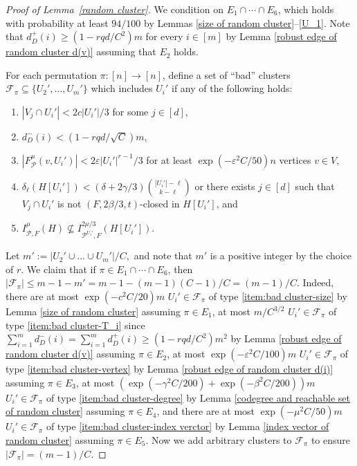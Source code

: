 \documentclass[11pt, letterpaper]{amsart}
\theoremstyle{plain}
\numberwithin{equation}{section}
\theoremstyle{definition}
\renewcommand{\vec}[1]{{\mathbf #1}}
\begin{document}
 
\begin{proof}[Proof of Lemma~\ref{random cluster}]
We condition on $E_1\cap \cdots\cap E_6$, which holds with probability at least $94/100$ by Lemmas \ref{size of random cluster}--\ref{U_1}. Note that $d_D^+(i)\ge(1-rqd/C^2)m $ for every $i\in [m]$ by Lemma \ref{robust edge of random cluster d(v)} assuming that \(E_2\) holds.

        For each permutation $\pi:[n]\rightarrow [n]$, define a set of ``bad'' clusters $\mathcal{F}_{\pi}\subseteq\{U_2',\dots,U_m'\}$ which includes $U_i'$ if any of the following holds:


        \begin{enumerate}[label=(A\arabic*)]
            \item $|V_j\cap U_i'|<2c|U_i'|/3$ for some $j\in [d]$, \label{item:bad cluster-size}
            \item $d_D^-(i)<(1-rqd/\sqrt{C})m$,\label{item:bad cluster-T_i}
            \item $|F^{\mu}_{\mathcal{P}}(v,U_i')|$$< 2\varepsilon{|U_i'|}^{r-1}/3$ for at least $\exp{\left(-\varepsilon^2 C/50\right)}n$ vertices $v\in V$,\label{item:bad cluster-vertex}
            \item $\delta_{\ell}(H[U_i'])<(\delta+2\gamma/3)\binom{|U_i'|-\ell}{k-\ell}$ or there exists $j\in[d]$ such that $V_j\cap U_i'$ is not $(F,2\beta/3,t)$-closed in $H[U_i']$, and \label{item:bad cluster-degree}
            \item 
            \(I_{\mathcal{P},F}^{\mu}(H)\nsubseteq I_{ \mathcal{P}^{U_i'},F}^{2\mu/3}(H[U_i'])\).\label{item:bad cluster-index verctor}
        \end{enumerate}
        Let $m':=|U_2'\cup\dots\cup U_m'|/C,$ and note that $m'$ is a positive integer by the choice of $r$. We claim that if $\pi \in E_1\cap \cdots\cap E_6$, then $|\mathcal{F}_{\pi}|\le m-1-m'=m-1-(m-1)(C-1)/C=(m-1)/C$. Indeed, 
        there are at most $\exp{(-c^2C/20)}m$ $U_i'\in \mathcal{F}_{\pi}$ of type \ref{item:bad cluster-size} by Lemma \ref{size of random cluster} assuming $\pi \in E_1$,  
        at most $m/C^{3/2}$ $U_i'\in \mathcal{F}_{\pi}$ of type \ref{item:bad cluster-T_i} since $\sum_{i=1}^md_D^-(i)=\sum_{i=1}^md_D^+(i)\ge (1-rqd/C^2)m^2$ by Lemma \ref{robust edge of random cluster d(v)} assuming $\pi \in E_2$, 
        at most $\exp{\left(-\varepsilon^2 C/100\right)}m$ $U_i'\in \mathcal{F}_{\pi}$ of type \ref{item:bad cluster-vertex} by Lemma \ref{robust edge of random cluster d(i)} assuming $\pi \in E_3$, 
        at most $\left(\exp{\left(-\gamma^2 C/200\right)}+\exp{\left(-\beta^2 C/200\right)}\right)m$ $U_i'\in \mathcal{F}_{\pi}$ of type \ref{item:bad cluster-degree} by Lemma \ref{codegree and reachable set of random cluster} assuming $\pi \in E_4$,
        and there are at most $\exp{(-\mu^2C/50)}m$ $U_i'\in \mathcal{F}_{\pi}$ of type \ref{item:bad cluster-index verctor} by Lemma \ref{index vector of random cluster} assuming $\pi \in E_5$.       
Now we add arbitrary clusters to $\mathcal{F}_{\pi}$ to ensure $|\mathcal{F}_{\pi}|=(m-1)/C$.


\end{proof}
\end{document}
